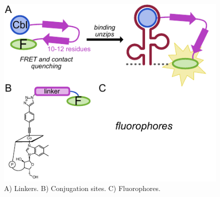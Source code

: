 \begin{figure}
\begin{centering}
\includegraphics[width=\textwidth]{figures/aim1v2.pdf}

\end{centering}
\footnotesize
\caption{\label{figure:aim1}
A) Linkers. B) Conjugation sites. C) Fluorophores.
}
\end{figure}

